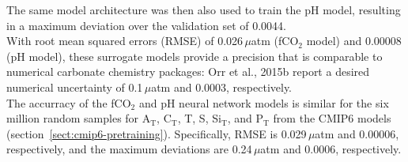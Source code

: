 \documentclass{article}
\begin{document}
	The same model architecture was then also used to train the pH model, %
	resulting in a maximum deviation over the validation set of 0.0044. \\
	With root mean squared errors (RMSE) of 0.026\,$\mu$atm (fCO$_2$ model) and 0.00008 (pH model), these surrogate models provide a precision that is comparable to numerical carbonate chemistry packages: Orr et al., 2015b report a desired numerical uncertainty of 0.1\,$\mu$atm and 0.0003, respectively. \\
	The accurracy of the fCO$_2$ and pH neural network models is similar for the six million random samples for A$_\text{T}$, C$_\text{T}$, T, S, Si$_\text{T}$, and P$_\text{T}$ from the CMIP6 models (section~\ref{sect:cmip6-pretraining}). Specifically, RMSE is 0.029\,$\mu$atm and 0.00006, respectively, and the maximum deviations are 0.24\,$\mu$atm and 0.0006, respectively.     
	
\end{document}
